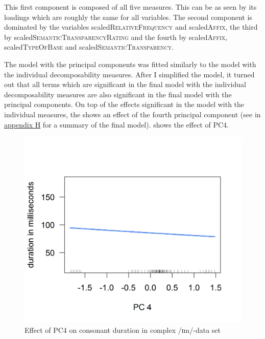 This first component is composed of all five measures. This can be as seen by its loadings which are roughly the same for all variables. The second component is dominated by the variables scaled\textsc{RelativeFrequency} and scaled\textsc{Affix}, the third by scaled\textsc{SemanticTransparencyRating} and the fourth by scaled\textsc{Affix}, scaled\textsc{TypeOfBase} and scaled\textsc{SemanticTransparency}. 


The model with the principal components was fitted similarly to the model with the individual decomposability measures. After I simplified the model, it turned out that all terms which are significant in the final model with the individual decomposability measures are also significant in the final model with the principal components. On top of the effects significant in the model with the individual measures, the  shows an effect of the fourth principal component (see  in \hyperref[Appendix H: Model Summaries Experiment]{appendix H} for a summary of the final model).  shows the effect of \textsc{PC4}.

\begin{figure} 
	

	\includegraphics [scale=0.5] {images/Experiment/imModelPC}
	\caption{Effect of PC4 on consonant duration in complex /ɪm/-data set}
	\label{fig:PC 4 imComplex experiment}

\end{figure}


